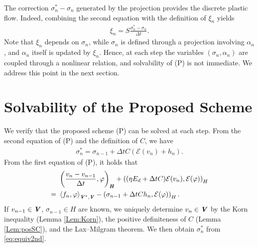 \documentclass[11pt, a4paper]{article}
\newcommand{\dt}{{\Delta t}}
\newcommand{\E}{{\mathcal{E}}}
\newcommand{\bm}[1]{\textbf{\textit{#1}}}%
\newcommand{\Hv}{{\bm{H}}}
\newcommand{\Vv}{{\bm{V}}}
\newcommand{\Hs}{{H}}
\newcommand{\blaket}[2]{ \left\langle {#1},{#2}\right\rangle_{\Vv^*,\Vv} }
\newcommand{\inner}[3]{ \left( {#1},{#2}\right)_{#3} }
\newcommand{\sigmas}[1]{{\sigma_{#1}^*}}
\begin{document}
The correction $\sigmas{n}-\sigma_n$ generated by the projection provides the discrete plastic flow. Indeed, combining the second equation with the definition of $\xi_n$ yields
\begin{align}\label{eq:xiequiv}
    \xi_n = S\frac{\sigmas{n} - \sigma_n}{\dt}.
\end{align}
Note that $\xi_n$ depends on $\sigma_n$, while $\sigma_n$ is defined through a projection involving $\alpha_n$, and $\alpha_n$ itself is updated by $\xi_n$. Hence, at each step the variables $(\sigma_n,\alpha_n)$ are coupled through a nonlinear relation, and solvability of (P) is not immediate. We address this point in the next section.

\section{Solvability of the Proposed Scheme}

We verify that the proposed scheme (P) can be solved at each step. From the second equation of (P) and the definition of $C$, we have 
\begin{align}\label{eq:equiv2nd}
    \sigmas{n}=\sigma_{n-1}+\dt C(\E(v_n)+h_n).
\end{align} 
From the first equation of (P), it holds that
\begin{align*}
    &\inner{\frac{v_n-v_{n-1}}{\dt}}{\varphi}{\Hv}
	+ \left((\eta E_d+\dt C)\E(v_n),\E(\varphi)\right)_\Hs\\
	=~& \blaket{f_n}{\varphi} 
	- \left(\sigma_{n-1}+\dt Ch_n,\E(\varphi)\right)_\Hs.
\end{align*}
If $v_{n-1}\in\Vv$, $\sigma_{n-1}\in\Hs$ are known, we uniquely determine $v_n\in\Vv$ by the Korn inequality (Lemma \ref{Lem:Korn}), the positive definiteness of $C$ (Lemma \ref{Lem:posSC}), and the Lax--Milgram theorem. We then obtain $\sigmas{n}$ from \eqref{eq:equiv2nd}.
\end{document}
